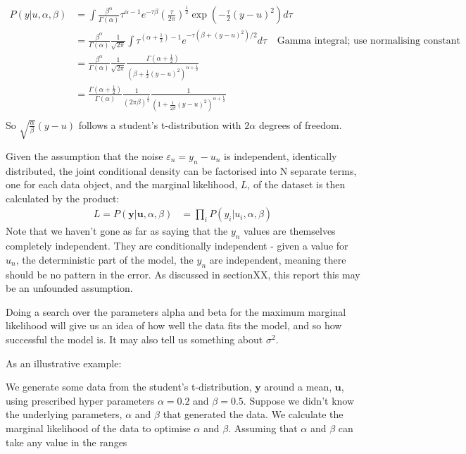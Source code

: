 \documentclass{article}
\begin{document}
\begin{equation}
\begin{split}
P(y|u,\alpha,\beta) &= \int \frac{\beta^\alpha}{\Gamma(\alpha)} \tau^{\alpha -1} e^{-\tau\beta} \left(\frac{\tau}{2\pi}\right)^{\frac{1}{2}} \exp\left(-\frac{\tau}{2}(y-u)^2\right) d\tau\\
&= \frac{\beta^\alpha}{\Gamma(\alpha)}\frac{1}{\sqrt{2\pi}}\int \tau^{(\alpha+\frac{1}{2}) -1} e^{-\tau(\beta + (y-u)^2)/2} d\tau \,\,\,\,\,\ \text{Gamma integral; use normalising constant}\\ 
&=\frac{\beta^\alpha}{\Gamma(\alpha)}\frac{1}{\sqrt{2\pi}}\frac{\Gamma(\alpha + \frac{1}{2})}{(\beta + \frac{1}{2}(y-u)^2)^{\alpha+\frac{1}{2}}}\\
&=\frac{\Gamma(\alpha+\frac{1}{2})}{\Gamma(\alpha)}\frac{1}{(2\pi\beta)^{\frac{1}{2}}}\frac{1}{(1+ \frac{1}{2\beta}(y-u)^2)^{\alpha+\frac{1}{2}}}\\
\end{split}
\end{equation}
So $\sqrt{\frac{\alpha}{\beta}}(y-u)$ follows a student's t-distribution with $2\alpha$ degrees of freedom.

Given the assumption that the noise $\varepsilon_n = y_n - u_n$ is independent, identically distributed, the joint conditional density can be factorised into N separate terms, one for each data object, and the marginal likelihood, $L$, of the dataset is then calculated by the product:
\begin{equation}
\begin{split}
L = P(\boldsymbol{y}|\boldsymbol{u}, \alpha,\beta) & =\prod_i{P(y_i|u_i, \alpha,\beta)}
\end{split}
\end{equation}
Note that we haven't gone as far as saying that the $y_n$ values are themselves completely independent. They are conditionally independent - given a value for $u_n$, the deterministic part of the model, the $y_n$ are independent, meaning there should be no pattern in the error. As discussed in sectionXX, this report this may be an unfounded assumption.

Doing a search over the parameters alpha and beta for the maximum marginal likelihood will give us an idea of how well the data fits the model, and so how successful the model is. It may also tell us something about $\sigma^2$.

As an illustrative example:

We generate some data from the student's t-distribution, $\boldsymbol{y}$ around a mean, $\boldsymbol{u}$, using prescribed hyper parameters $\alpha = 0.2$ and $\beta =0.5$. Suppose we didn't know the underlying parameters, $\alpha$ and $\beta$ that generated the data. We calculate the marginal likelihood of the data to optimise $\alpha$ and $\beta$. Assuming that $\alpha$ and $\beta$ can take any value in the ranges
\end{document}
